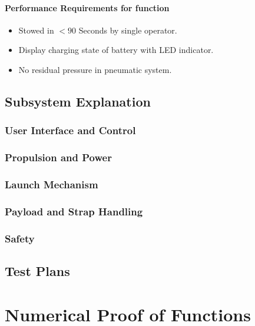 \documentclass[a4paper,10pt]{article}
\begin{document}
\paragraph{Performance Requirements for function}

\begin{itemize}
    \item Stowed in $<90$ Seconds by single operator.
    \item Display charging state of battery with LED indicator.
    \item No residual pressure in pneumatic system.
\end{itemize}


\newpage

\subsection{Subsystem Explanation}

\subsubsection{User Interface and Control}

\subsubsection{Propulsion and Power}

\subsubsection{Launch Mechanism}

\subsubsection{Payload and Strap Handling}

\subsubsection{Safety}

\subsection{Test Plans}

\newpage

\section{Numerical Proof of Functions}
\end{document}
